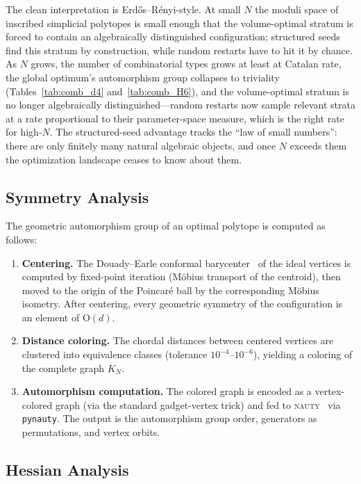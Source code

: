 \documentclass[11pt]{article}
\begin{document}
The clean interpretation is Erd\H{o}s--R\'enyi-style.  At small $N$
the moduli space of inscribed simplicial polytopes is small enough
that the volume-optimal stratum is forced to contain an
algebraically distinguished configuration; structured seeds find
this stratum by construction, while random restarts have to hit it
by chance.  As $N$ grows, the number of combinatorial types grows
at least at Catalan rate, the global optimum's automorphism group
collapses to triviality (Tables~\ref{tab:comb_d4}
and~\ref{tab:comb_H6}), and the volume-optimal stratum is no
longer algebraically distinguished---random restarts now sample
relevant strata at a rate proportional to their parameter-space
measure, which is the right rate for high-$N$.  The structured-seed
advantage tracks the ``law of small numbers'': there are only
finitely many natural algebraic objects, and once $N$ exceeds them
the optimization landscape ceases to know about them.

\subsection{Symmetry Analysis}

The geometric automorphism group of an optimal polytope is computed
as follows:
\begin{enumerate}[label=(\roman*)]
\item \textbf{Centering.}  The Douady--Earle conformal
  barycenter~\cite{DouadyEarle} of the ideal vertices is
  computed by fixed-point iteration (M\"obius transport of the
  centroid), then moved to the origin of the Poincar\'e ball by
  the corresponding M\"obius isometry.  After centering, every
  geometric symmetry of the configuration is an element of
  $\mathrm{O}(d)$.
\item \textbf{Distance coloring.}  The chordal distances between
  centered vertices are clustered into equivalence classes
  (tolerance $10^{-4}$--$10^{-6}$), yielding a coloring of
  the complete graph $K_N$.
\item \textbf{Automorphism computation.}  The colored graph is
  encoded as a vertex-colored graph (via the standard
  gadget-vertex trick) and fed to
  \textsc{nauty}~\cite{McKayPiperno} via \texttt{pynauty}.
  The output is the automorphism group order, generators as
  permutations, and vertex orbits.
\end{enumerate}

\subsection{Hessian Analysis}
\end{document}
